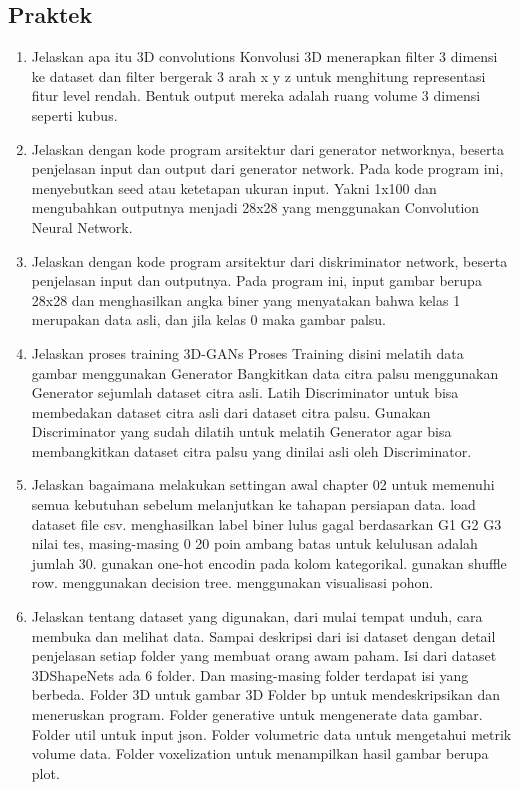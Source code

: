 \subsection{Praktek}
\begin{enumerate}

	\item Jelaskan apa itu 3D convolutions
Konvolusi 3D menerapkan filter 3 dimensi ke dataset dan filter bergerak 3 arah x y z untuk menghitung representasi fitur level rendah. Bentuk output mereka adalah ruang volume 3 dimensi seperti kubus.

	\item Jelaskan dengan kode program arsitektur dari generator networknya, beserta penjelasan input dan output dari generator network.
Pada kode program ini, menyebutkan seed atau ketetapan ukuran input. Yakni 1x100 dan mengubahkan outputnya menjadi 28x28 yang menggunakan Convolution Neural Network.

		

	\item Jelaskan dengan kode program arsitektur dari diskriminator network, beserta penjelasan input dan outputnya.
Pada program ini, input gambar berupa 28x28 dan menghasilkan angka biner yang menyatakan bahwa kelas 1 merupakan data asli, dan jila kelas 0 maka gambar palsu.

		

	\item Jelaskan proses training 3D-GANs
Proses Training disini melatih data gambar menggunakan Generator
Bangkitkan data citra palsu menggunakan Generator sejumlah dataset citra asli.
Latih Discriminator untuk bisa membedakan dataset citra asli dari dataset citra palsu.
Gunakan Discriminator yang sudah dilatih untuk melatih Generator agar bisa membangkitkan dataset citra palsu yang dinilai asli oleh Discriminator.

        	\item Jelaskan bagaimana melakukan settingan awal chapter 02 untuk memenuhi semua kebutuhan sebelum melanjutkan ke tahapan persiapan data.
load dataset file csv.
menghasilkan label biner lulus gagal berdasarkan G1 G2 G3 nilai tes, masing-masing 0 20 poin ambang batas untuk kelulusan adalah jumlah 30.
gunakan one-hot encodin pada kolom kategorikal.
gunakan shuffle row.
menggunakan decision tree.
menggunakan visualisasi pohon.

        	\item Jelaskan tentang dataset yang digunakan, dari mulai tempat unduh, cara membuka dan melihat data. Sampai deskripsi dari isi dataset dengan detail penjelasan setiap folder yang membuat orang awam paham.
Isi dari dataset 3DShapeNets ada 6 folder. Dan masing-masing folder terdapat isi yang berbeda.
Folder 3D untuk gambar 3D
Folder bp untuk mendeskripsikan dan meneruskan program.
Folder generative untuk mengenerate data gambar.
Folder util untuk input json.
Folder volumetric data untuk mengetahui metrik volume data.
Folder voxelization untuk menampilkan hasil gambar berupa plot.


\end{enumerate}
